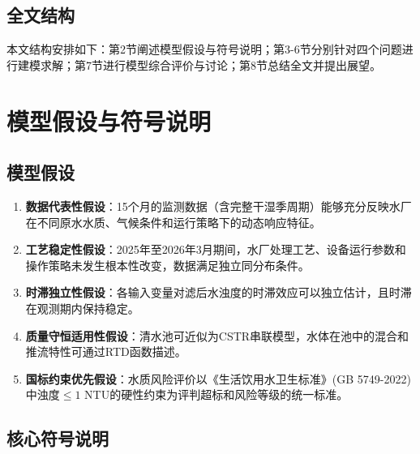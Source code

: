 \documentclass[12pt,a4paper]{ctexart}
\begin{document}
\subsection{全文结构}

本文结构安排如下：第2节阐述模型假设与符号说明；第3-6节分别针对四个问题进行建模求解；第7节进行模型综合评价与讨论；第8节总结全文并提出展望。

\newpage

\section{模型假设与符号说明}

\subsection{模型假设}

\begin{enumerate}
    \item \textbf{数据代表性假设}：15个月的监测数据（含完整干湿季周期）能够充分反映水厂在不同原水水质、气候条件和运行策略下的动态响应特征。
    \item \textbf{工艺稳定性假设}：2025年至2026年3月期间，水厂处理工艺、设备运行参数和操作策略未发生根本性改变，数据满足独立同分布条件。
    \item \textbf{时滞独立性假设}：各输入变量对滤后水浊度的时滞效应可以独立估计，且时滞在观测期内保持稳定。
    \item \textbf{质量守恒适用性假设}：清水池可近似为CSTR串联模型，水体在池中的混合和推流特性可通过RTD函数描述。
    \item \textbf{国标约束优先假设}：水质风险评价以《生活饮用水卫生标准》(GB 5749-2022)中浊度$\leq 1$ NTU的硬性约束为评判超标和风险等级的统一标准。
\end{enumerate}

\subsection{核心符号说明}
\end{document}
